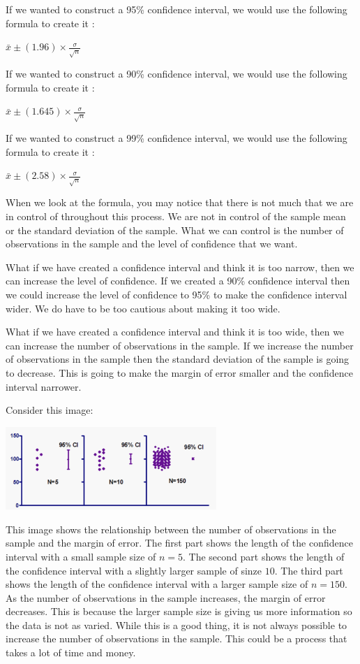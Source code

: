 \documentclass[
  letterpaper,
  DIV=11,
  numbers=noendperiod]{scrreprt}
\begin{document}
If we wanted to construct a 95\% confidence interval, we would use the
following formula to create it :

\(\displaystyle{\bar{x} \pm (1.96) \times \frac{\sigma}{\sqrt{n}}}\)

If we wanted to construct a 90\% confidence interval, we would use the
following formula to create it :

\(\displaystyle{\bar{x} \pm (1.645) \times \frac{\sigma}{\sqrt{n}}}\)

If we wanted to construct a 99\% confidence interval, we would use the
following formula to create it :

\(\displaystyle{\bar{x} \pm (2.58) \times \frac{\sigma}{\sqrt{n}}}\)

When we look at the formula, you may notice that there is not much that
we are in control of throughout this process. We are not in control of
the sample mean or the standard deviation of the sample. What we can
control is the number of observations in the sample and the level of
confidence that we want.

What if we have created a confidence interval and think it is too
narrow, then we can increase the level of confidence. If we created a
90\% confidence interval then we could increase the level of confidence
to 95\% to make the confidence interval wider. We do have to be too
cautious about making it too wide.

What if we have created a confidence interval and think it is too wide,
then we can increase the number of observations in the sample. If we
increase the number of observations in the sample then the standard
deviation of the sample is going to decrease. This is going to make the
margin of error smaller and the confidence interval narrower.

Consider this image:

\includegraphics[width=0.6\textwidth,height=\textheight]{./images/EPCI_3.jpg}

This image shows the relationship between the number of observations in
the sample and the margin of error. The first part shows the length of
the confidence interval with a small sample size of \(n=5\). The second
part shows the length of the confidence interval with a slightly larger
sample of sinze \(10\). The third part shows the length of the
confidence interval with a larger sample size of \(n=150\). As the
number of observations in the sample increases, the margin of error
decreases. This is because the larger sample size is giving us more
information so the data is not as varied. While this is a good thing, it
is not always possible to increase the number of observations in the
sample. This could be a process that takes a lot of time and money.
\end{document}
